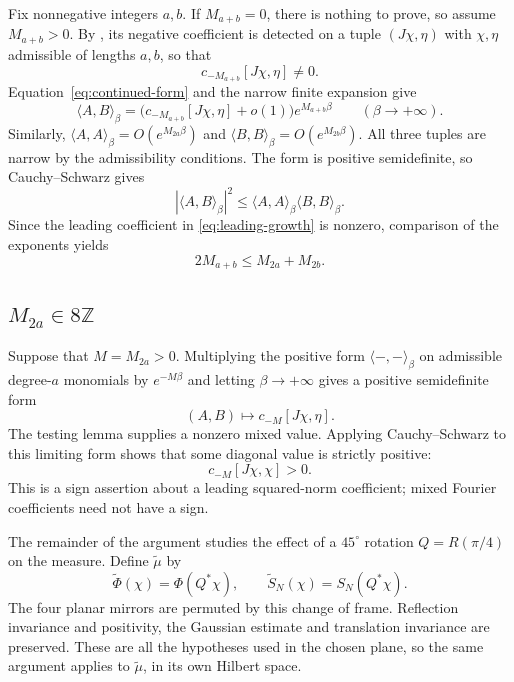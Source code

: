 \documentclass[11pt, letterpaper, reqno]{amsart}
\theoremstyle{definition}
\theoremstyle{remark}
\newcommand{\bbZ}{\mathbb{Z}}
\begin{document}
Fix nonnegative integers $a,b$. If $M_{a+b}=0$, there is nothing to
prove, so assume $M_{a+b}>0$. By , its negative
coefficient is detected on a tuple $(J\chi,\eta)$ with $\chi,\eta$
admissible of lengths $a,b$, so that
\begin{equation}
 c_{-M_{a+b}}[J\chi,\eta]\neq0.
\end{equation}
Equation~\eqref{eq:continued-form} and the narrow finite expansion give
\begin{equation}\label{eq:leading-growth}
 \langle A,B\rangle_\beta
   =\bigl(c_{-M_{a+b}}[J\chi,\eta]+o(1)\bigr)
                  e^{M_{a+b}\beta}\qquad(\beta\to+\infty).
\end{equation}
Similarly,
$\langle A,A\rangle_\beta=O(e^{M_{2a}\beta})$ and
$\langle B,B\rangle_\beta=O(e^{M_{2b}\beta})$.
All three tuples are narrow by the admissibility conditions.
The form is positive semidefinite, so Cauchy--Schwarz gives
\begin{equation}\label{eq:ext_CS}
 |\langle A,B\rangle_\beta|^2
       \leq\langle A,A\rangle_\beta\langle B,B\rangle_\beta.
\end{equation}
Since the leading coefficient in \eqref{eq:leading-growth} is nonzero,
comparison of the exponents yields
\begin{equation}\label{eq:convexity}
 2M_{a+b}\leq M_{2a}+M_{2b}.
\end{equation}

\subsection{$M_{2a}\in8\bbZ$}

Suppose that $M=M_{2a}>0$. Multiplying the positive form
$\langle-,-\rangle_\beta$ on admissible degree-$a$ monomials by $e^{-M\beta}$
and letting $\beta\to+\infty$ gives a positive semidefinite form
\begin{equation}
 (A,B)\longmapsto c_{-M}[J\chi,\eta].
\end{equation}
The testing lemma supplies a nonzero mixed value. Applying
Cauchy--Schwarz to this limiting form shows that some diagonal value
is strictly positive:
\begin{equation}\label{eq:c_pos}
 c_{-M}[J\chi,\chi]>0.
\end{equation}
This is a sign assertion about a leading squared-norm coefficient;
mixed Fourier coefficients need not have a sign.

The remainder of the argument studies the effect of a $45^\circ$
rotation $Q=R(\pi/4)$ on the measure. Define $\tilde\mu$ by
\begin{equation}
 \tilde\Phi(\chi)=\Phi(Q^*\chi),\qquad
 \tilde S_N(\chi)=S_N(Q^*\chi).
\end{equation}
The four planar mirrors are permuted by this change of frame.
Reflection invariance and positivity, the Gaussian estimate and
translation invariance are preserved. These are all the hypotheses
used in the chosen plane, so the same argument applies to
$\tilde\mu$, in its own Hilbert space.
\end{document}

